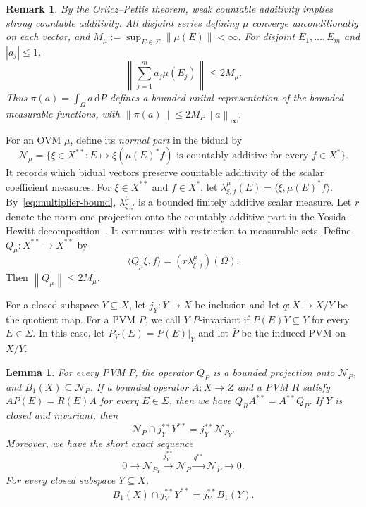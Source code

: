 \documentclass[11pt,leqno]{amsart}
\theoremstyle{compact}
\numberwithin{equation}{section}
\newtheorem{lemma}[theorem]{Lemma}
\theoremstyle{compactremark}
\newtheorem{remark}[theorem]{Remark}
\theoremstyle{compact}
\newcommand{\1}{\mathbbm{1}}
\newcommand{\rmd}{\mathrm{d}}
\newcommand{\norm}[1]{\left\|#1\right\|}
\newcommand{\abs}[1]{\left|#1\right|}
\newcommand{\inp}[2]{\langle #1,#2\rangle}
\begin{document}
\begin{remark}\label{rem:ovm-bounds}
By the Orlicz--Pettis theorem, weak countable additivity implies strong countable additivity. All disjoint series defining $\mu$ converge unconditionally on each vector, and $M_\mu:=\sup_{E\in\Sigma}\norm{\mu(E)}<\infty$. For disjoint $E_1,\ldots,E_m$ and  $\abs{a_j}\leq1$,
\begin{equation}\label{eq:multiplier-bound}
\norm{\sum_{j=1}^m a_j\mu(E_j)}\leq2M_\mu.
\end{equation}
Thus $\pi(a)=\int_\Omega a\,\rmd P$ defines a bounded unital representation of the bounded measurable functions, with $\norm{\pi(a)}\leq2M_P\norm{a}_\infty$.
\end{remark}

For an OVM $\mu$, define its \emph{normal part} in the bidual by
\[
\mathcal N_\mu=\{\xi\in X^{**}:E\mapsto\xi(\mu(E)^*f)\text{ is countably additive for every }f\in X^*\}.
\]
It records which bidual vectors preserve countable additivity of the scalar coefficient measures.
\begingroup
For $\xi\in X^{**}$ and $f\in X^*$, let $\lambda^\mu_{\xi,f}(E)=\inp{\xi}{\mu(E)^*f}$. By~\eqref{eq:multiplier-bound}, $\lambda^\mu_{\xi,f}$ is a bounded finitely additive scalar measure. Let $r$ denote the norm-one projection onto the countably additive part in the Yosida--Hewitt decomposition~\cite{YosidaHewitt1952}. It commutes with restriction to measurable sets. Define $Q_\mu\colon X^{**}\to X^{**}$ by
\begin{equation}\label{eq:ovm-normal-projection}
\inp{Q_\mu\xi}{f}=(r\lambda^\mu_{\xi,f})(\Omega).
\end{equation}
Then $\norm{Q_\mu}\leq2M_\mu$.
\par\endgroup

For a closed subspace $Y\subseteq X$, let $j_Y\colon Y\to X$ be inclusion and let $q\colon X\to X/Y$ be the quotient map. For a PVM $P$, we call $Y$ $P$-invariant if $P(E)Y\subseteq Y$ for every $E\in\Sigma$. In this case, let $P_Y(E)=P(E)|_Y$ and let $\bar P$ be the induced PVM on $X/Y$.

\begin{lemma}\label{lem:normal-restriction}
For every PVM $P$, the operator $Q_P$ is a bounded projection onto $\mathcal N_P$, and $B_1(X)\subseteq\mathcal N_P$.
\begingroup
If a bounded operator $A\colon X\to Z$ and a PVM $R$ satisfy $AP(E)=R(E)A$ for every $E\in\Sigma$, then we have $ Q_RA^{**}=A^{**}Q_P $.
\endgroup
If $Y$ is closed and invariant, then
\begin{equation}\label{eq:normal-restriction}
\mathcal N_P\cap j_Y^{**}Y^{**}=j_Y^{**}\mathcal N_{P_Y}.
\end{equation}
\begingroup
Moreover, we have the short exact sequence
\[
0\longrightarrow\mathcal N_{P_Y}\xrightarrow{j_Y^{**}}\mathcal N_P\xrightarrow{q^{**}}\mathcal N_{\bar P}\longrightarrow0.
\]
\endgroup
For every closed subspace $Y\subseteq X$,
\begin{equation}\label{eq:baire-hereditary}
B_1(X)\cap j_Y^{**}Y^{**}=j_Y^{**}B_1(Y).
\end{equation}
\end{lemma}
\end{document}
